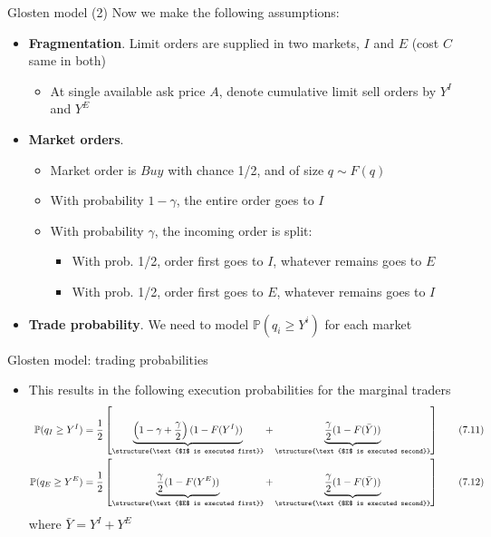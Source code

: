 \documentclass[english,10pt
,aspectratio=169
]{beamer}
\begin{document}
\begin{frame}{Glosten model (2)}
	Now we make the following assumptions:
	\begin{itemize}
		\item \textbf{Fragmentation}. Limit orders are supplied in two markets, $I$ and $E$ (cost $C$ same in both)
		\begin{itemize}
			\item At single available ask price $A$, denote cumulative limit sell orders by $Y^I$ and $Y^E$
		\end{itemize}
		\item \textbf{Market orders}. 
		\begin{itemize}
			\item Market order is $Buy$ with chance 1/2, and of size $q \sim F(q)$
			\item With probability $1-\gamma$, the entire order goes to $I$
			\item With probability $\gamma$, the incoming order is split:
			\begin{itemize}
				\item With prob. 1/2, order first goes to $I$, whatever remains goes to $E$
				\item With prob. 1/2, order first goes to $E$, whatever remains goes to $I$
			\end{itemize}
		\end{itemize}
		\item  \textbf{Trade probability}. We need to model $\mathbb{P}(q_i \geq Y^i)$ for each market
	\end{itemize}
\end{frame}


\begin{frame}{Glosten model: trading probabilities}
	\begin{itemize}
		\item This results in the following execution probabilities for the marginal traders
		\begin{align}
		\mathbb{P}(q_I \geq Y^I) & = \frac{1}{2} \left[\underbrace{\left(1-\gamma+\frac{\gamma}{2} \right) (1-F(Y^I))}_{\structure{\text{$I$ is executed first}}} + \underbrace{\frac{\gamma}{2}(1-F(\bar{Y}))}_{\structure{\text{$I$ is executed second}}}\right] \tag{7.11} \\
		\mathbb{P}(q_E \geq Y^E) & = \frac{1}{2} \left[\underbrace{\frac{\gamma}{2} (1-F(Y^E))}_{\structure{\text{$E$ is executed first}}} + \underbrace{\frac{\gamma}{2}(1-F(\bar{Y}))}_{\structure{\text{$E$ is executed second}}}\right] \tag{7.12}
		\end{align}
		where $\bar{Y}=Y^I+Y^E$
	\end{itemize}
\end{frame}
\end{document}
